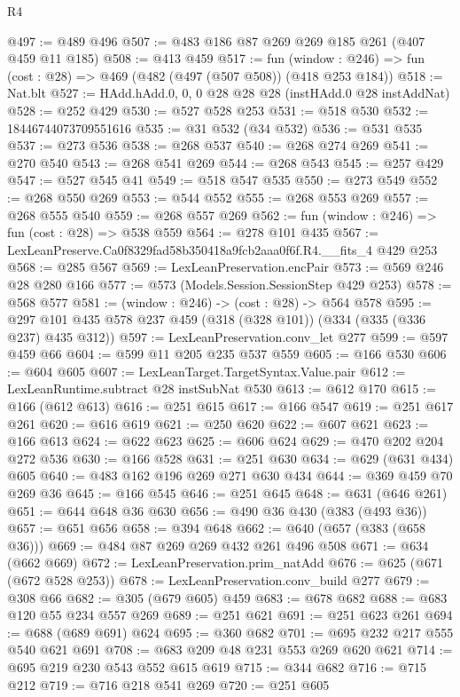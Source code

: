 \begin{lexlean}{R4}
\begin{coremodule}
@497 := @489 @496
@507 := @483 @186 @87 @269 @269 @185 @261 (@407 @459 @11 @185)
@508 := @413 @459
@517 := fun (window : @246) => fun (cost : @28) => @469 (@482 (@497 (@507 @508)) (@418 @253 @184))
@518 := Nat.blt
@527 := HAdd.hAdd.{0, 0, 0} @28 @28 @28 (instHAdd.{0} @28 instAddNat)
@528 := @252 @429
@530 := @527 @528 @253
@531 := @518 @530
@532 := 18446744073709551616
@535 := @31 @532 (@34 @532)
@536 := @531 @535
@537 := @273 @536
@538 := @268 @537
@540 := @268 @274 @269
@541 := @270 @540
@543 := @268 @541 @269
@544 := @268 @543
@545 := @257 @429
@547 := @527 @545 @41
@549 := @518 @547 @535
@550 := @273 @549
@552 := @268 @550 @269
@553 := @544 @552
@555 := @268 @553 @269
@557 := @268 @555 @540
@559 := @268 @557 @269
@562 := fun (window : @246) => fun (cost : @28) => @538 @559
@564 := @278 @101 @435
@567 := LexLeanPreserve.Ca0f8329fad58b350418a9fcb2aaa0f6f.R4.__fits_4 @429 @253
@568 := @285 @567
@569 := LexLeanPreservation.encPair
@573 := @569 @246 @28 @280 @166
@577 := @573 (Models.Session.SessionStep @429 @253)
@578 := @568 @577
@581 := (window : @246) -> (cost : @28) -> @564 @578
@595 := @297 @101 @435 @578 @237 @459 (@318 (@328 @101)) (@334 (@335 (@336 @237) @435 @312))
@597 := LexLeanPreservation.conv_let @277
@599 := @597 @459 @66
@604 := @599 @11 @205 @235 @537 @559
@605 := @166 @530
@606 := @604 @605
@607 := LexLeanTarget.TargetSyntax.Value.pair
@612 := LexLeanRuntime.subtract @28 instSubNat @530
@613 := @612 @170
@615 := @166 (@612 @613)
@616 := @251 @615
@617 := @166 @547
@619 := @251 @617 @261
@620 := @616 @619
@621 := @250 @620
@622 := @607 @621
@623 := @166 @613
@624 := @622 @623
@625 := @606 @624
@629 := @470 @202 @204 @272 @536
@630 := @166 @528
@631 := @251 @630
@634 := @629 (@631 @434) @605
@640 := @483 @162 @196 @269 @271 @630 @434
@644 := @369 @459 @70 @269 @36
@645 := @166 @545
@646 := @251 @645
@648 := @631 (@646 @261)
@651 := @644 @648 @36 @630
@656 := @490 @36 @430 (@383 (@493 @36))
@657 := @651 @656
@658 := @394 @648
@662 := @640 (@657 (@383 (@658 @36)))
@669 := @484 @87 @269 @269 @432 @261 @496 @508
@671 := @634 (@662 @669)
@672 := LexLeanPreservation.prim_natAdd
@676 := @625 (@671 (@672 @528 @253))
@678 := LexLeanPreservation.conv_build @277
@679 := @308 @66
@682 := @305 (@679 @605) @459
@683 := @678 @682
@688 := @683 @120 @55 @234 @557 @269
@689 := @251 @621
@691 := @251 @623 @261
@694 := @688 (@689 @691) @624
@695 := @360 @682
@701 := @695 @232 @217 @555 @540 @621 @691
@708 := @683 @209 @48 @231 @553 @269 @620 @621
@714 := @695 @219 @230 @543 @552 @615 @619
@715 := @344 @682
@716 := @715 @212
@719 := @716 @218 @541 @269
@720 := @251 @605

\end{coremodule}
\end{lexlean}
